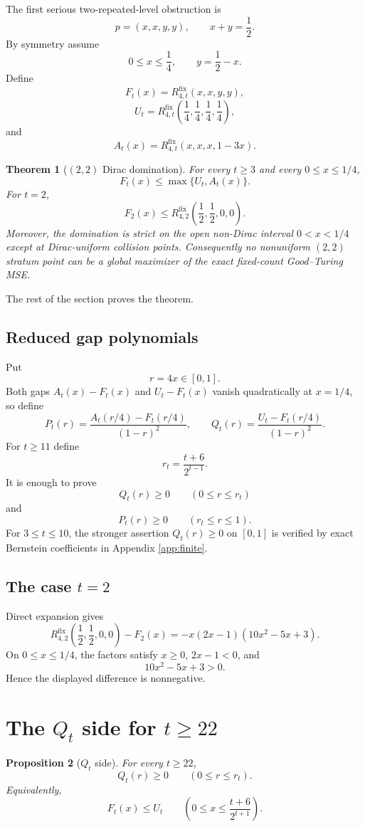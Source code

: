 \documentclass[11pt]{article}
\newtheorem{theorem}{Theorem}[section]
\newtheorem{proposition}[theorem]{Proposition}
\theoremstyle{definition}
\newcommand{\fix}{\mathrm{fix}}
\begin{document}
The first serious two-repeated-level obstruction is
\[
  p=(x,x,y,y),
  \qquad x+y=\frac12.
\]
By symmetry assume
\[
  0\le x\le\frac14,
  \qquad y=\frac12-x.
\]
Define
\[
  F_t(x)=R_{4,t}^{\fix}(x,x,y,y),
\]
\[
  U_t=R_{4,t}^{\fix}\left(\frac14,\frac14,\frac14,\frac14\right),
\]
and
\[
  A_t(x)=R_{4,t}^{\fix}(x,x,x,1-3x).
\]

\begin{theorem}[$(2,2)$ Dirac domination]\label{thm:twotwo}
For every $t\ge3$ and every $0\le x\le1/4$,
\[
  F_t(x)\le \max\{U_t,A_t(x)\}.
\]
For $t=2$,
\[
  F_2(x)\le R_{4,2}^{\fix}\left(\frac12,\frac12,0,0\right).
\]
Moreover, the domination is strict on the open non-Dirac interval
$0<x<1/4$ except at Dirac-uniform collision points.  Consequently no
nonuniform $(2,2)$ stratum point can be a global maximizer of the exact
fixed-count Good--Turing MSE.
\end{theorem}

The rest of the section proves the theorem.

\subsection{Reduced gap polynomials}

Put
\[
  r=4x\in[0,1].
\]
Both gaps $A_t(x)-F_t(x)$ and $U_t-F_t(x)$ vanish quadratically at $x=1/4$, so define
\[
  P_t(r)=\frac{A_t(r/4)-F_t(r/4)}{(1-r)^2},
  \qquad
  Q_t(r)=\frac{U_t-F_t(r/4)}{(1-r)^2}.
\]
For $t\ge11$ define
\[
  r_t=\frac{t+6}{2^{t-1}}.
\]
It is enough to prove
\[
  Q_t(r)\ge0\qquad(0\le r\le r_t)
\]
and
\[
  P_t(r)\ge0\qquad(r_t\le r\le1).
\]
For $3\le t\le10$, the stronger assertion $Q_t(r)\ge0$ on $[0,1]$ is verified by exact Bernstein coefficients in Appendix \ref{app:finite}.

\subsection{The case $t=2$}

Direct expansion gives
\[
 R_{4,2}^{\fix}\left(\frac12,\frac12,0,0\right)-F_2(x)
 =-x(2x-1)(10x^2-5x+3).
\]
On $0\le x\le1/4$, the factors satisfy $x\ge0$, $2x-1<0$, and
\[
  10x^2-5x+3>0.
\]
Hence the displayed difference is nonnegative.

\section{The $Q_t$ side for $t\ge22$}

\begin{proposition}[$Q_t$ side]\label{prop:Qside}
For every $t\ge22$,
\[
  Q_t(r)\ge0\qquad(0\le r\le r_t).
\]
Equivalently,
\[
  F_t(x)\le U_t
  \qquad
  \left(0\le x\le\frac{t+6}{2^{t+1}}\right).
\]
\end{proposition}
\end{document}
